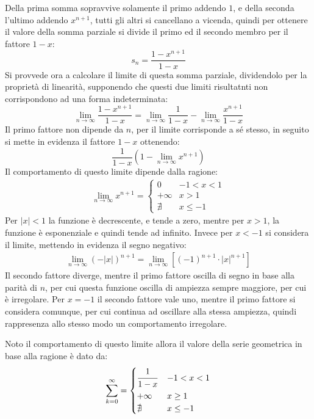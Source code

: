 \documentclass{article}
\numberwithin{equation}{subsection}
\begin{document}
Della prima somma sopravvive solamente il primo addendo $1$, e della seconda l'ultimo addendo $x^{n+1}$, tutti gli altri si cancellano a vicenda, quindi per ottenere il valore della somma parziale si divide il primo ed il secondo membro per il fattore $1-x$:
\begin{equation}
    s_n=\displaystyle\frac{1-x^{n+1}}{1-x}
\end{equation}
Si provvede ora a calcolare il limite di questa somma parziale, dividendolo per la proprietà di linearità, supponendo che questi due limiti risultatnti non corrispondono ad una forma indeterminata:
\begin{equation*}
    \lim_{n\to\infty}\displaystyle\frac{1-x^{n+1}}{1-x}=\lim_{n\to\infty}\frac{1}{1-x}-\lim_{n\to\infty}\frac{x^{n+1}}{1-x}
\end{equation*}
Il primo fattore non dipende da $n$, per il limite corrisponde a sé stesso, in seguito si mette in evidenza il fattore $1-x$ ottenendo:
\begin{equation*}
    \displaystyle\frac{1}{1-x}\left(1-\lim_{n\to\infty}x^{n+1}\right)
\end{equation*}
Il comportamento di questo limite dipende dalla ragione:
\begin{gather*}
    \lim_{n\to\infty}x^{n+1}=\begin{cases}
        0 &-1<x<1\\
        +\infty  & x>1\\
        \nexists & x\leq-1
    \end{cases}
\end{gather*}
Per $|x|<1$ la funzione è decrescente, e tende a zero, mentre per $x>1$, la funzione è esponenziale e quindi tende ad infinito. Invece per $x<-1$ si considera il limite, mettendo in evidenza il segno negativo:
\begin{gather*}
    \lim_{n\to\infty}(-|x|)^{n+1}=
    \lim_{n\to\infty}\left[(-1)^{n+1}\cdot |x|^{n+1}\right]
\end{gather*}
Il secondo fattore diverge, mentre il primo fattore oscilla di segno in base alla parità di $n$, per cui questa funzione oscilla di ampiezza sempre maggiore, per cui è irregolare. 
Per $x=-1$ il secondo fattore vale uno, mentre il primo fattore si considera comunque, per cui continua ad oscillare alla stessa ampiezza, quindi rappresenza allo stesso modo un comportamento irregolare. 

Noto il comportamento di questo limite allora il valore della serie geometrica in base alla ragione è dato da:
\begin{equation*}
    \displaystyle\sum_{k=0}^\infty=\begin{cases}
        \displaystyle\frac{\strut 1}{\strut 1-x} &-1<x<1\\
        +\infty & x\geq1\\
        \nexists & x\leq-1
    \end{cases}
\end{equation*}
\end{document}

